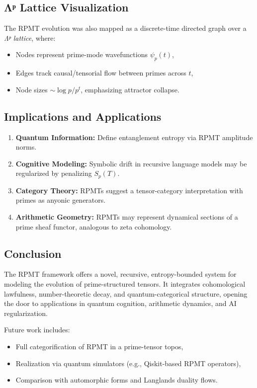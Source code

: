 \documentclass[12]{amsart}
\theoremstyle{plain}
\begin{document}
\subsection{Λᵖ Lattice Visualization}

The RPMT evolution was also mapped as a discrete-time directed graph over a \textit{Λᵖ lattice}, where:
\begin{itemize}
    \item Nodes represent prime-mode wavefunctions $\psi_p(t)$,
    \item Edges track causal/tensorial flow between primes across $t$,
    \item Node sizes $\sim \log p / p^t$, emphasizing attractor collapse.
\end{itemize}

\subsection{Implications and Applications}

\begin{enumerate}
    \item \textbf{Quantum Information:} Define entanglement entropy via RPMT amplitude norms.
    \item \textbf{Cognitive Modeling:} Symbolic drift in recursive language models may be regularized by penalizing $S_p(T)$.
    \item \textbf{Category Theory:} RPMTs suggest a tensor-category interpretation with primes as anyonic generators.
    \item \textbf{Arithmetic Geometry:} RPMTs may represent dynamical sections of a prime sheaf functor, analogous to zeta cohomology.
\end{enumerate}

\subsection{Conclusion}

The RPMT framework offers a novel, recursive, entropy-bounded system for modeling the evolution of prime-structured tensors. It integrates cohomological lawfulness, number-theoretic decay, and quantum-categorical structure, opening the door to applications in quantum cognition, arithmetic dynamics, and AI regularization.

Future work includes:
\begin{itemize}
    \item Full categorification of RPMT in a prime-tensor topos,
    \item Realization via quantum simulators (e.g., Qiskit-based RPMT operators),
    \item Comparison with automorphic forms and Langlands duality flows.
\end{itemize}
\end{document}

